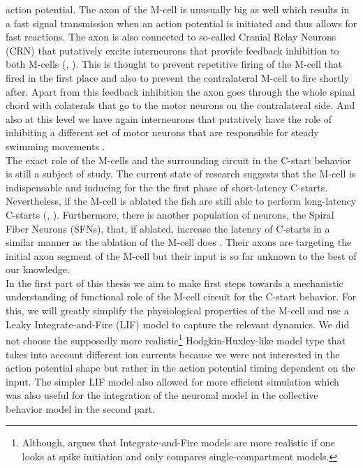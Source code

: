 \documentclass[a4paper,10pt,hidelinks]{scrreprt}
\begin{document}
	action potential.
	The axon of the M-cell is unusually big as well which results in a fast signal transmission 
	when an action potential is initiated and thus allows for fast reactions.
	The axon is also connected to so-called Cranial Relay Neurons (CRN) that putatively excite interneurons that provide feedback inhibition to both M-cells (\cite{Koyama2011}, \cite{Hale2016}).
	This is thought to prevent repetitive firing of the M-cell that fired in the first place and 
	also to prevent the contralateral M-cell to fire shortly after.
	Apart from this feedback inhibition the axon goes through the whole spinal chord with 
	colaterals that go to the motor neurons on the contralateral side.
	And also at this level we have again interneurons that putatively have the role of inhibiting a 
	different set of motor neurons that are responsible for steady swimming movements 
	\citep{Song2015}.\\
	The exact role of the M-cells and the surrounding circuit in the C-start behavior is still a 
	subject of study.
	The current state of research suggests that the M-cell is indispensable and inducing for the 
	the first phase of short-latency C-starts.
	Nevertheless, if the M-cell is ablated the fish are still able to perform long-latency C-starts 
	(\cite{Lacoste2015}, \cite{Dunn2016}).
	Furthermore, there is another population of neurons, the Spiral Fiber Neurons (SFNs), that, if ablated, increase the latency of C-starts in a similar manner as the ablation of the M-cell does \citep{Lacoste2015}.
    Their axons are targeting the initial axon segment of the M-cell but their input is so far unknown to the best of our knowledge.\\
	In the first part of this thesis we aim to make first steps towards a mechanistic understanding 
	of functional role of the M-cell circuit for the C-start behavior.
	For this, we will greatly simplify the physiological properties of the M-cell and use a Leaky 
	Integrate-and-Fire (LIF) model to capture the relevant dynamics.
	We did not choose the supposedly more realistic\footnote{Although, \cite{Brette2015} argues that Integrate-and-Fire models are more realistic if one looks at spike initiation and only compares single-compartment models.}  Hodgkin-Huxley-like model type that takes into account different ion currents because we were not interested in the action potential shape but rather in the action potential timing dependent on the input.
	The simpler LIF model also allowed for more efficient simulation which was also useful for the 
	integration of the neuronal model in the collective behavior model in the second part.\\
\end{document}
